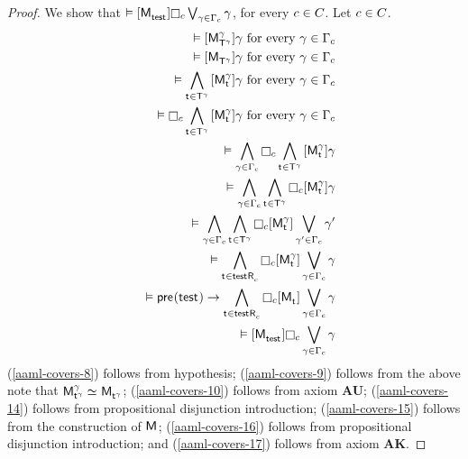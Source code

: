 \begin{proof}
We show that $\entails \actionA{\aPModel{\aStateTest}} \necessaryC \bigvee_{\gamma \in \Gamma_\agentC} \gamma$, for every $c \in C$.
Let $c \in C$.
\begin{eqnarray}
    && \entails \actionA{\aPModel[\gamma]{\aStatesT[\gamma]}} \gamma \text{ for every } \gamma \in \Gamma_\agentC \label{aaml-covers-8}\\
    && \entails \actionA{\aPModel{\aStatesT[\gamma]}} \gamma \text{ for every } \gamma \in \Gamma_\agentC \label{aaml-covers-9}\\
    && \entails \bigwedge_{\aStateT \in \aStatesT[\gamma]} \actionA{\aPModel[\gamma]{\aStateT}} \gamma \text{ for every } \gamma \in \Gamma_\agentC \label{aaml-covers-10}\\
    && \entails \necessaryC \bigwedge_{\aStateT \in \aStatesT[\gamma]} \actionA{\aPModel[\gamma]{\aStateT}} \gamma \text{ for every } \gamma \in \Gamma_\agentC \label{aaml-covers-11}\\
    && \entails \bigwedge_{\gamma \in \Gamma_\agentC} \necessaryC \bigwedge_{\aStateT \in \aStatesT[\gamma]} \actionA{\aPModel[\gamma]{\aStateT}} \gamma \label{aaml-covers-12}\\
    && \entails \bigwedge_{\gamma \in \Gamma_\agentC} \bigwedge_{\aStateT \in \aStatesT[\gamma]} \necessaryC \actionA{\aPModel[\gamma]{\aStateT}} \gamma \label{aaml-covers-13}\\
    && \entails \bigwedge_{\gamma \in \Gamma_\agentC} \bigwedge_{\aStateT \in \aStatesT[\gamma]} \necessaryC \actionA{\aPModel[\gamma]{\aStateT}} \bigvee_{\gamma' \in \Gamma_\agentC} \gamma' \label{aaml-covers-14}\\
    && \entails \bigwedge_{\aStateT \in \aSuccessorsC{\aStateTest}} \necessaryC \actionA{\aPModel[\gamma]{\aStateT}} \bigvee_{\gamma \in \Gamma_\agentC} \gamma \label{aaml-covers-15}\\
    && \entails \aPrecondition(\aStateTest) \implies \bigwedge_{\aStateT \in \aSuccessorsC{\aStateTest}} \necessaryC \actionA{\aPModel{\aStateT}} \bigvee_{\gamma \in \Gamma_\agentC} \gamma \label{aaml-covers-16}\\
    && \entails \actionA{\aPModel{\aStateTest}} \necessaryC \bigvee_{\gamma \in \Gamma_\agentC} \gamma \label{aaml-covers-17}
\end{eqnarray}
(\ref{aaml-covers-8}) follows from hypothesis;
(\ref{aaml-covers-9}) follows from the above note that $\aPModel[\gamma]{\aStateT[\gamma]} \bisimilar \aPModel{\aStateT[\gamma]}$;
(\ref{aaml-covers-10}) follows from \axiomRamlK{} axiom {\bf AU};
(\ref{aaml-covers-14}) follows from propositional disjunction introduction;
(\ref{aaml-covers-15}) follows from the construction of $\aModel$;
(\ref{aaml-covers-16}) follows from propositional disjunction introduction; and
(\ref{aaml-covers-17}) follows from \axiomRamlK{} axiom {\bf AK}.


\end{proof}
